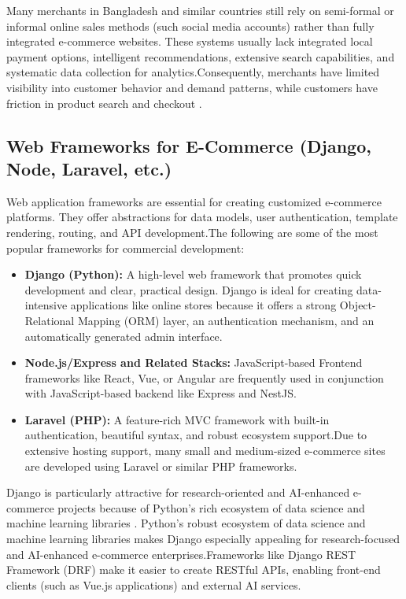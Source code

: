 Many merchants in Bangladesh and similar countries still rely on semi-formal or informal online sales methods (such social media accounts) rather than fully integrated e-commerce websites. These systems usually lack integrated local payment options, intelligent recommendations, extensive search capabilities, and systematic data collection for analytics.Consequently, merchants have limited visibility into customer behavior and demand patterns, while customers have friction in product search and checkout \cite{lee2020checkout,hasan2021mobile}.

\subsection{Web Frameworks for E\texorpdfstring{-}{-}Commerce (Django, Node, Laravel, etc.)}
Web application frameworks are essential for creating customized e-commerce platforms. They offer abstractions for data models, user authentication, template rendering, routing, and API development.The following are some of the most popular frameworks for commercial development:
\begin{itemize}
  \item \textbf{Django (Python):} A high-level web framework that promotes quick development and clear, practical design\cite{holovaty2009django}.  Django is ideal for creating data-intensive applications like online stores because it offers a strong Object-Relational Mapping (ORM) layer, an authentication mechanism, and an automatically generated admin interface.
  \item \textbf{Node.js/Express and Related Stacks:} JavaScript-based Frontend frameworks like React, Vue, or Angular are frequently used in conjunction with JavaScript-based backend like Express and NestJS.
  \item \textbf{Laravel (PHP):}  A feature-rich MVC framework with built-in authentication, beautiful syntax, and robust ecosystem support.Due to extensive hosting support, many small and medium-sized e-commerce sites are developed using Laravel or similar PHP frameworks.
\end{itemize}
Django is particularly attractive for research-oriented and AI-enhanced e-commerce projects because of Python's rich ecosystem of data science and machine learning libraries \cite{holovaty2009django}.  
Python's robust ecosystem of data science and machine learning libraries makes Django especially appealing for research-focused and AI-enhanced e-commerce enterprises.Frameworks like Django REST Framework (DRF) make it easier to create RESTful APIs, enabling front-end clients (such as Vue.js applications) and external AI services.


